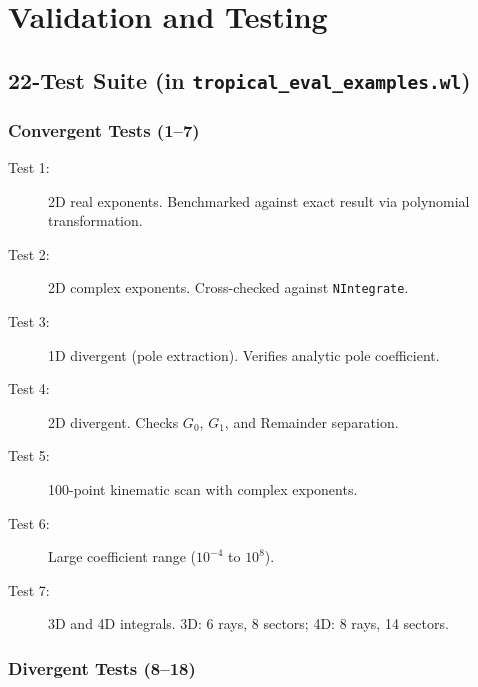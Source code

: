 \documentclass[11pt,a4paper]{article}
\begin{document}
\section{Validation and Testing}

\subsection{22-Test Suite (in \texttt{tropical\_eval\_examples.wl})}

\subsubsection*{Convergent Tests (1--7)}

\begin{description}
  \item[Test 1:] 2D real exponents. Benchmarked against exact result via polynomial transformation.
  \item[Test 2:] 2D complex exponents. Cross-checked against \texttt{NIntegrate}.
  \item[Test 3:] 1D divergent (pole extraction). Verifies analytic pole coefficient.
  \item[Test 4:] 2D divergent. Checks $G_0$, $G_1$, and Remainder separation.
  \item[Test 5:] 100-point kinematic scan with complex exponents.
  \item[Test 6:] Large coefficient range ($10^{-4}$ to $10^8$).
  \item[Test 7:] 3D and 4D integrals. 3D: 6 rays, 8 sectors; 4D: 8 rays, 14 sectors.
\end{description}

\subsubsection*{Divergent Tests (8--18)}
\end{document}
